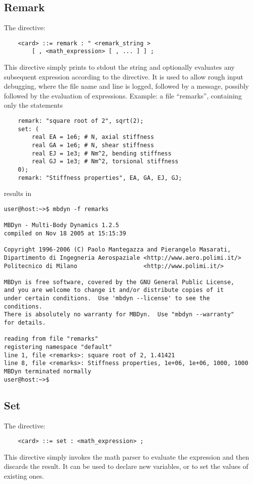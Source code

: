 \subsection{Remark}
The  directive:
\begin{verbatim}
    <card> ::= remark : " <remark_string >
        [ , <math_expression> [ , ... ] ] ;
\end{verbatim}
This directive simply prints to stdout the string  and
optionally evaluates any subsequent expression 
according to the  directive.
It is used to allow rough input debugging, where the file name and line 
is logged, followed by a message, possibly followed by the evaluation 
of expressions. 
Example:
a file ``remarks'', containing only the statements
\begin{verbatim}
    remark: "square root of 2", sqrt(2);
    set: (
        real EA = 1e6; # N, axial stiffness
        real GA = 1e6; # N, shear stiffness
        real EJ = 1e3; # Nm^2, bending stiffness
        real GJ = 1e3; # Nm^2, torsional stiffness
    0);
    remark: "Stiffness properties", EA, GA, EJ, GJ;
\end{verbatim}
results in
\begin{verbatim}
user@host:~>$ mbdyn -f remarks

MBDyn - Multi-Body Dynamics 1.2.5
compiled on Nov 18 2005 at 15:15:39

Copyright 1996-2006 (C) Paolo Mantegazza and Pierangelo Masarati,
Dipartimento di Ingegneria Aerospaziale <http://www.aero.polimi.it/>
Politecnico di Milano                   <http://www.polimi.it/>

MBDyn is free software, covered by the GNU General Public License,
and you are welcome to change it and/or distribute copies of it
under certain conditions.  Use 'mbdyn --license' to see the conditions.
There is absolutely no warranty for MBDyn.  Use "mbdyn --warranty"
for details.

reading from file "remarks"
registering namespace "default"
line 1, file <remarks>: square root of 2, 1.41421
line 8, file <remarks>: Stiffness properties, 1e+06, 1e+06, 1000, 1000
MBDyn terminated normally
user@host:~>$
\end{verbatim}


\subsection{Set}
The  directive:
\begin{verbatim}
    <card> ::= set : <math_expression> ;
\end{verbatim}
This directive simply invokes the math parser to evaluate the expression
 and then discards the result. It can be used
to declare new variables, or to set the values of existing ones.



